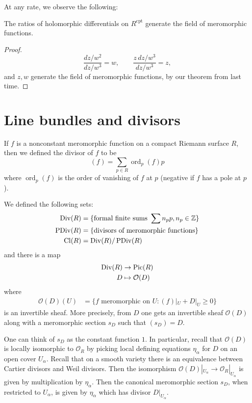 \documentclass[12pt]{article}
\begin{document}
\begin{example}
\begin{enumerate}
At any rate, we observe the following:

\begin{proposition}
The ratios of holomorphic differentials on $R^{\mathrm{cpt}}$ generate the field of meromorphic functions.
\end{proposition}

\begin{proof}
\[
\frac{dz/w^2}{dz/w^3} = w, \qquad
\frac{z\,dz/w^3}{dz/w^3} = z,
\]
and $z, w$ generate the field of meromorphic functions, by our theorem from last time.
\end{proof}

\end{enumerate}
\end{example}

\section{Line bundles and divisors}
If $f$ is a nonconstant meromorphic function on a compact Riemann surface $R$, then we defined the divisor of $f$ to be \[(f) = \sum_{p \in R} \operatorname{ord}_p(f) p\] where $\operatorname{ord}_p(f)$ is the order of vanishing of $f$ at $p$ (negative if $f$ has a pole at $p$). 

We defined the following sets:
\begin{align*}
    \operatorname{Div}(R) & = \{\text{formal finite sums } \sum n_p p, n_p \in \mathbb{Z}\} \\
    \operatorname{PDiv}(R) & = \{\text{divisors of meromorphic functions}\} \\
    \operatorname{Cl}(R) & = \operatorname{Div}(R)/\operatorname{PDiv}(R)
\end{align*} and there is a map \begin{align*}
    \operatorname{Div}(R) & \to \operatorname{Pic}(R) \\
    D & \mapsto \mathcal{O}(D)
\end{align*} where \begin{align*}
    \mathcal{O}(D)(U) & = \{f \text{ meromorphic on } U : (f)|_U + D|_U \geq 0\}
\end{align*} is an invertible sheaf. More precisely, from $D$ one gets an invertible sheaf $\mathcal{O}(D)$ along with a meromorphic section $s_D$ such that $(s_D)=D$. 

One can think of $s_D$ as the constant function $1$. In particular, recall that $\mathcal{O}(D)$ is locally isomorphic to $\mathcal{O}_R$ by picking local defining equations $\eta_\alpha$ for $D$ on an open cover $U_\alpha$. Recall that on a smooth variety there is an equivalence between Cartier divisors and Weil divisors.
Then the isomorphism $\mathcal{O}(D)|_{U_\alpha} \to \mathcal{O}_R|_{U_\alpha}$ is given by multiplication by $\eta_\alpha$. Then the canonical meromorphic section $s_D$, when restricted to $U_\alpha$, is given by $\eta_\alpha$ which has divisor $D|_{U_\alpha}$.
\end{document}
